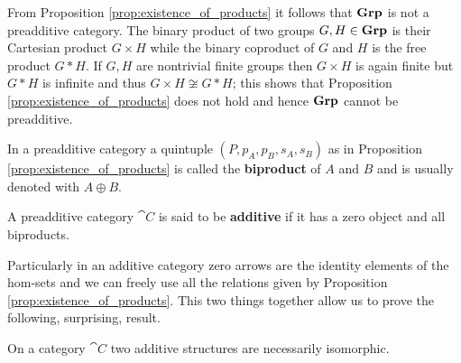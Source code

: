 \begin{remark}
  From Proposition \ref{prop:existence_of_products} it follows that \(\text{\normalfont\textbf{Grp}}\) is not a preadditive category. The binary product of two groups \(G,H\in\text{\normalfont\textbf{Grp}}\) is their Cartesian product \(G\times H\) while the binary coproduct of \(G\) and \(H\) is the free product \(G*H\). If \(G,H\) are nontrivial finite groups then \(G\times H\) is again finite but \(G*H\) is infinite and thus \(G\times H\not\cong G*H\); this shows that Proposition \ref{prop:existence_of_products} does not hold and hence \(\text{\normalfont\textbf{Grp}}\) cannot be preadditive.
\end{remark}

\begin{definition}
  \label{def:biproduct}
  In a preadditive category a quintuple \((P, p_A, p_B, s_A, s_B)\) as in Proposition \ref{prop:existence_of_products} is called the {\bf biproduct} of \(A\) and \(B\) and is usually denoted with \(A\oplus B\).
\end{definition}

\begin{definition}
  \label{def:additive_category}
  A preadditive category \(\cat{C}\) is said to be {\bf additive} if it has a zero object and all biproducts.
\end{definition}

Particularly in an additive category zero arrows are the identity elements of the hom-sets and we can freely use all the relations given by Proposition \ref{prop:existence_of_products}. This two things together allow us to prove the following, surprising, result.

\begin{proposition}
  \label{prop:uniqueness_of_additive_structure}
  On a category \(\cat{C}\) two additive structures are necessarily isomorphic.
\end{proposition}

